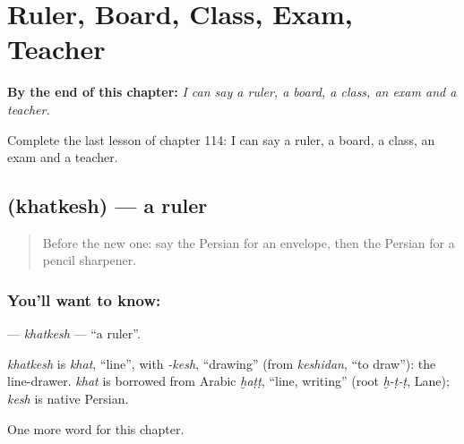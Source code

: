 
\chapter{Ruler, Board, Class, Exam, Teacher}
\label{ch:fa-ruler-board-class-exam-teacher}

\begin{chapteropening}
\textbf{By the end of this chapter:} \emph{I can say a ruler, a board, a class, an exam and a teacher.}

Complete the last lesson of chapter 114: I can say a ruler, a board, a class, an exam and a teacher.
\end{chapteropening}

\section[\texorpdfstring{\fa{خط} \fa{کش} (khatkesh)}{خط کش (khatkesh)}]{  (khatkesh) — a ruler}

\label{lesson:FA-C114-khatkesh}



\begin{quote}
Before the new one: say the Persian for an envelope, then the Persian for a pencil sharpener.
\end{quote}

\subsection*{You'll want to know:  }
\textbf{ } — \emph{khatkesh} — \textquotedblleft{}a ruler\textquotedblright{}.

\begin{cousinweb}
\emph{khatkesh} is \emph{khat}, \textquotedblleft{}line\textquotedblright{}, with \emph{-kesh}, \textquotedblleft{}drawing\textquotedblright{} (from \emph{keshidan}, \textquotedblleft{}to draw\textquotedblright{}): the line-drawer. \emph{khat} is borrowed from Arabic \emph{ḫaṭṭ}, \textquotedblleft{}line, writing\textquotedblright{} (root \emph{ḫ-ṭ-ṭ}, Lane); \emph{kesh} is native Persian.
\end{cousinweb}

\begin{grammarlens}[title={What you've built}]
One more word for this chapter.
\end{grammarlens}

